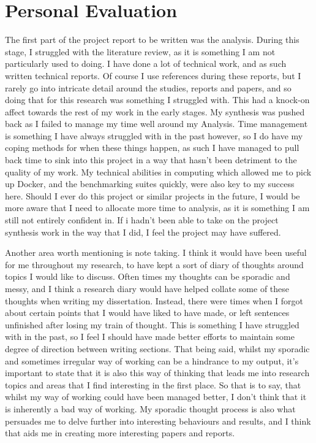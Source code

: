 \section{Personal Evaluation}%
The first part of the project report to be written was the analysis. During this stage, I struggled with the literature review, as it is something I am not particularly used to doing. I have done a lot of technical work, and as such written technical reports. Of course I use references during these reports, but I rarely go into intricate detail around the studies, reports and papers, and so doing that for this research was something I struggled with. This had a knock-on affect towards the rest of my work in the early stages. My synthesis was pushed back as I failed to manage my time well around my Analysis. Time management is something I have always struggled with in the past however, so I do have my coping methods for when these things happen, as such I have managed to pull back time to sink into this project in a way that hasn't been detriment to the quality of my work. My technical abilities in computing which allowed me to pick up Docker, and the benchmarking suites quickly, were also key to my success here. Should I ever do this project or similar projects in the future, I would be more aware that I need to allocate more time to analysis, as it is something I am still not entirely confident in. If i hadn't been able to take on the project synthesis work in the way that I did, I feel the project may have suffered.

Another area worth mentioning is note taking. I think it would have been useful for me throughout my research, to have kept a sort of diary of thoughts around topics I would like to discuss. Often times my thoughts can be sporadic and messy, and I think a research diary would have helped collate some of these thoughts when writing my dissertation. Instead, there were times when I forgot about certain points that I would have liked to have made, or left sentences unfinished after losing my train of thought. This is something I have struggled with in the past, so I feel I should have made better efforts to maintain some degree of direction between writing sections. That being said, whilst my sporadic and sometimes irregular way of working can be a hindrance to my output, it's important to state that it is also this way of thinking that leads me into research topics and areas that I find interesting in the first place. So that is to say, that whilst my way of working could have been managed better, I don't think that it is inherently a bad way of working. My sporadic thought process is also what persuades me to delve further into interesting behaviours and results, and I think that aids me in creating more interesting papers and reports.

